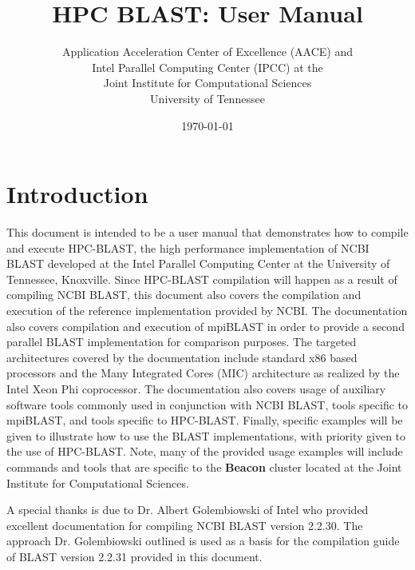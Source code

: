 \documentclass[10pt]{article}
\newcommand{\beac}{\textbf{Beacon }}
\begin{document}
\title{HPC BLAST: User Manual\\
         }
\author{Application Acceleration Center of Excellence (AACE) and\\
   Intel Parallel Computing Center (IPCC) at the\\
   Joint Institute for Computational Sciences\\University of Tennessee}
\date{\today}
\maketitle

\newpage

\tableofcontents

\newpage



\section{Introduction} \label{sec:intro}

This document is intended to be a user manual that demonstrates how to compile and execute HPC-BLAST, the high performance implementation of NCBI BLAST developed at the Intel Parallel Computing Center at the
University of Tennessee, Knoxville. Since HPC-BLAST compilation will happen as a result of compiling NCBI BLAST, this document also covers the compilation and execution of the reference implementation provided by NCBI.
The documentation also covers compilation and execution of mpiBLAST in order to provide a second parallel BLAST implementation for comparison purposes.  The targeted architectures covered by the documentation include
standard x86 based processors and the Many Integrated Cores (MIC) architecture as realized by the Intel Xeon Phi coprocessor.  The documentation also covers usage of auxiliary software tools commonly used in conjunction
with NCBI BLAST, tools specific to mpiBLAST, and tools specific to HPC-BLAST.  Finally, specific examples will be given to illustrate how to use the BLAST implementations, with priority given to the use of HPC-BLAST.
Note, many of the provided usage examples will include commands and tools that are specific to the \beac cluster located at the Joint Institute for Computational Sciences.

A special thanks is due to Dr. Albert Golembiowski of Intel who provided excellent documentation for compiling NCBI BLAST version 2.2.30.  The approach Dr. Golembiowski outlined is used as a basis for the compilation
guide of BLAST version 2.2.31
provided in this document.
\end{document}
